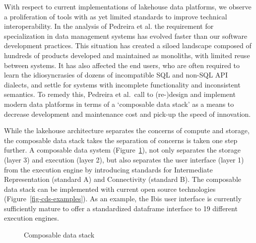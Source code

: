 \documentclass[
  authoryear]{elsarticle}
\begin{document}
With respect to current implementations of lakehouse data platforms, we
observe a proliferation of tools with as yet limited standards to
improve technical interoperability. In the analysis of Pedreira et al.
\citep{pedreira2023composable} the requirement for specialization in
data management systems has evolved faster than our software development
practices. This situation has created a siloed landscape composed of
hundreds of products developed and maintained as monoliths, with limited
reuse between systems. It has also affected the end users, who are often
required to learn the idiosyncrasies of dozens of incompatible SQL and
non-SQL API dialects, and settle for systems with incomplete
functionality and inconsistent semantics. To remedy this, Pedreira et
al.~call to (re-)design and implement modern data platforms in terms of
a `composable data stack' as a means to decrease development and
maintenance cost and pick-up the speed of innovation.

While the lakehouse architecture separates the concerns of compute and
storage, the composable data stack takes the separation of concerns is
taken one step further. A composable data system
(Figure~\ref{fig-composable-data-stack}), not only separates the storage
(layer 3) and execution (layer 2), but also separates the user interface
(layer 1) from the execution engine by introducing standards for
Intermediate Representation (standard A) and Connectivity (standard B).
The composable data stack can be implemented with current open source
technologies (Figure~\ref{fig-cds-examples}). As an example, the Ibis
user interface is currently sufficiently mature to offer a standardized
dataframe interface to 19 different execution engines.

\begin{figure}


\caption{\label{fig-composable-data-stack}Composable data stack}

\end{figure}%
\end{document}
